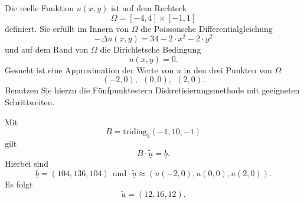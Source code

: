 Die reelle Funktion $u(x,y)$ ist auf dem Rechteck 
\[
\Omega = [-4, 4] \times [-1,1]
\]
definiert. Sie erfüllt im Innern von $\Omega$ die
Poissonsche Differentialgleichung 
\[
- \Delta u(x,y) = 34 - 2 \cdot x^2 - 2 \cdot y^2
\]
und auf dem Rand von $\Omega$ die Dirichletsche Bedingung 
\[
u(x,y) = 0.
\]
Gesucht ist eine Approximation der Werte von $u$ in den drei Punkten
von $\Omega$ 
\[
(-2,0), \ \  (0,0), \ \ (2,0).
\]
Benutzen Sie hierzu die Fünfpunktestern Diskretisierungsmethode mit
geeigneten Schrittweiten. 
 
\begin{loesung}
Mit 
\[
B = \mbox{tridiag}_3(-1,10,-1)
\]
gilt 
\[
B \cdot \underline{\tilde u} = \underline{b}.
\]
Hierbei sind 
\[
\underline{b} = (104, 136, 104) \ \ \mbox{und} \ \ \ \underline{\tilde u} \approx
(u(-2,0), u(0,0), u(2,0)).
\]
Es folgt 
\[
\underline{\tilde u} = (12, 16, 12).
\]
\end{loesung}
